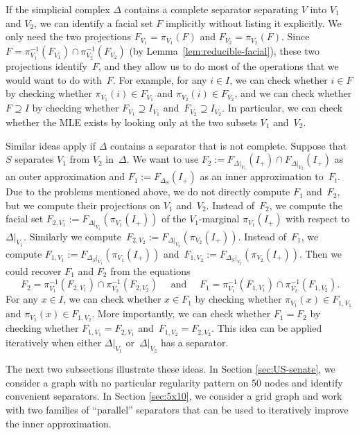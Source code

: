 \documentclass[aos,noinfoline]{imsart}
\newcommand{\face}{F}
\theoremstyle{remark}
\theoremstyle{definition}
\begin{document}
If the simplicial complex $\Delta$ contains a complete separator separating $V$ into $V_1$ and $V_2$, we can identify a
facial set $F$ implicitly without listing it explicitly.  We only need the two projections $F_{V_{1}}=\pi_{V_{1}}(F)$
and $F_{V_{2}}=\pi_{V_{2}}(F)$.  Since $F=\pi_{V_{1}}^{-1}(F_{V_{1}})\cap\pi_{V_{2}}^{-1}(F_{V_{2}})$ (by
Lemma~\ref{lem:reducible-facial}), these two projections identify~$F$, and they allow us to do most of the operations
that we would want to do with~$F$.  For example, for any $i\in I$, we can check whether $i\in F$ by checking whether
$\pi_{V_{1}}(i)\in F_{V_{1}}$ and $\pi_{V_{2}}(i)\in F_{V_{2}}$, and we can check whether $F\supseteq I$ by checking whether
$F_{V_{1}}\supseteq I_{V_{1}}$ and~$F_{V_{2}}\supseteq I_{V_{2}}$.  In particular, we can check whether the MLE exists by looking
only at the two subsets $V_{1}$ and~$V_{2}$.

Similar ideas apply if $\Delta$ contains a separator that is not complete.
Suppose that $S$ separates $V_{1}$ from $V_{2}$ in~$\Delta$.  We want to use
$F_{2}:=\face_{\Delta|_{V_{1}}}(I_{+})\cap\face_{\Delta|_{V_{2}}}(I_{+})$ as an outer approximation and
$F_{1}:=\face_{\Delta_{S}}(I_{+})$ as an inner approximation to~$F_{t}$.  Due to the
problems mentioned above, we do not directly compute $F_1$ and~$F_2$, but we compute their projections on $V_1$ and~$V_2$.
Instead of~$F_{2}$, we compute the facial set $F_{2,V_{1}}:=\face_{\Delta|_{V_{1}}}(\pi_{V_{1}}(I_{+}))$ of the
$V_{1}$-marginal $\pi_{V_{1}}(I_{+})$ with respect to~$\Delta|_{V_{1}}$.  Similarly we
compute~$F_{2,V_{2}}:=\face_{\Delta|_{V_{2}}}(\pi_{V_{2}}(I_{+}))$.  Instead of~$F_{1}$, we compute
$F_{1,V_{1}}:=\face_{\Delta_{S}|_{V_{1}}}(\pi_{V_{1}}(I_{+}))$
and~$F_{1,V_{2}}:=\face_{\Delta_{S}|_{V_{2}}}(\pi_{V_{2}}(I_{+}))$.  Then we could recover $F_1$ and $F_2$ from the
equations
\begin{equation*}
  F_{2} = \pi_{V_{1}}^{-1}(F_{2,V_{1}})\cap\pi_{V_{2}}^{-1}(F_{2,V_{2}})
  \quad\text{ and }\quad
  F_{1} = \pi_{V_{1}}^{-1}(F_{1,V_{1}})\cap\pi_{V_{2}}^{-1}(F_{1,V_{2}}).
\end{equation*}
For any $x\in I$, we can check whether $x\in F_{1}$ by checking whether $\pi_{V_{1}}(x)\in F_{1,V_{1}}$ and
$\pi_{V_{2}}(x)\in F_{1,V_{2}}$.  More importantly, we can check whether $F_{1}=F_{2}$ by checking whether
$F_{1,V_{1}}=F_{2,V_{1}}$ and~$F_{1,V_{2}}=F_{2,V_{2}}$.
%
This idea can be applied iteratively when either $\Delta|_{V_{1}}$ or~$\Delta|_{V_{2}}$ has a separator.

The next two subsections illustrate these ideas.  In Section \ref{sec:US-senate}, we consider a graph with no particular
regularity pattern on 50 nodes and identify convenient separators.
In Section \ref{sec:5x10}, we consider a grid graph and work with two families of ``parallel'' separators that can be
used to iteratively improve the inner approximation.
\end{document}
